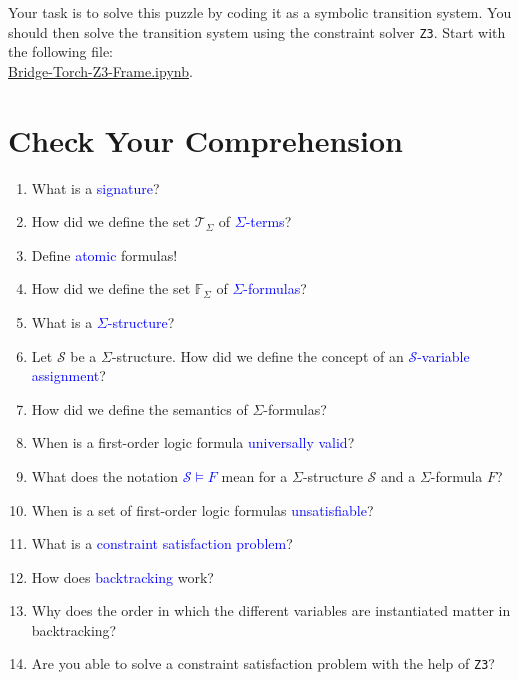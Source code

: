 \noindent
Your task is to solve this puzzle by coding it as a symbolic transition system.  You should then solve the
transition system using the constraint solver \texttt{Z3}.
Start with the following file:
\\[0.2cm]
\hspace*{1.3cm}
\href{https://github.com/karlstroetmann/Logic/blob/master/Java/Chapter-5/Bridge-Torch-Z3-Frame.ipynb}{Bridge-Torch-Z3-Frame.ipynb}.
\eox


\section{Check Your Comprehension}
\begin{enumerate}
\item What is a \textcolor{blue}{signature}?
\item How did we define the set $\mathcal{T}_\Sigma$ of \textcolor{blue}{$\Sigma$-terms}?
\item Define \textcolor{blue}{atomic} formulas!
\item How did we define the set $\mathbb{F}_\Sigma$ of \textcolor{blue}{$\Sigma$-formulas}?
\item What is a \textcolor{blue}{$\Sigma$-structure}?
\item Let $\mathcal{S}$ be a $\Sigma$-structure. How did we define the concept of
      an \textcolor{blue}{$\mathcal{S}$-variable assignment}?
\item How did we define the semantics of $\Sigma$-formulas?
\item When is a first-order logic formula \textcolor{blue}{universally valid}?
\item What does the notation \textcolor{blue}{$\mathcal{S} \models F$} mean for a $\Sigma$-structure $\mathcal{S}$ and a
      $\Sigma$-formula $F$?
\item When is a set of first-order logic formulas \textcolor{blue}{unsatisfiable}?
\item What is a \textcolor{blue}{constraint satisfaction problem}?
\item How does \textcolor{blue}{backtracking} work?
\item Why does the order in which the different variables are instantiated matter in backtracking?
\item Are you able to solve a constraint satisfaction problem with the help of \texttt{Z3}?
\end{enumerate}

